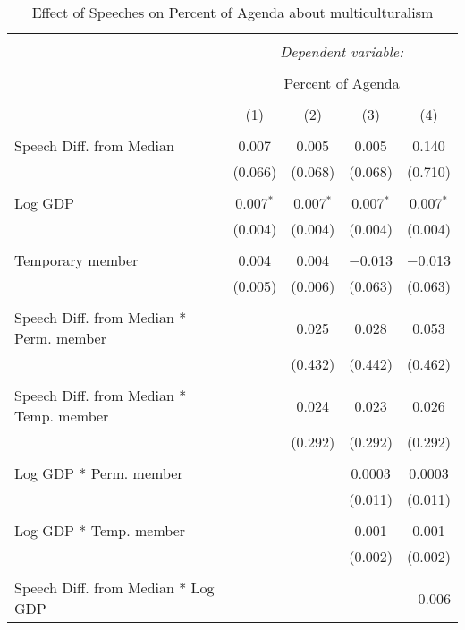 
\begin{table}[!htbp] \centering 
  \caption{Effect of Speeches on Percent of Agenda about multiculturalism} 
  \label{} 
\begin{tabular}{@{\extracolsep{5pt}}lcccc} 
\\[-1.8ex]\hline 
\hline \\[-1.8ex] 
 & \multicolumn{4}{c}{\textit{Dependent variable:}} \\ 
\cline{2-5} 
\\[-1.8ex] & \multicolumn{4}{c}{Percent of Agenda} \\ 
\\[-1.8ex] & (1) & (2) & (3) & (4)\\ 
\hline \\[-1.8ex] 
 Speech Diff. from Median & 0.007 & 0.005 & 0.005 & 0.140 \\ 
  & (0.066) & (0.068) & (0.068) & (0.710) \\ 
  & & & & \\ 
 Log GDP & 0.007$^{*}$ & 0.007$^{*}$ & 0.007$^{*}$ & 0.007$^{*}$ \\ 
  & (0.004) & (0.004) & (0.004) & (0.004) \\ 
  & & & & \\ 
 Temporary member & 0.004 & 0.004 & $-$0.013 & $-$0.013 \\ 
  & (0.005) & (0.006) & (0.063) & (0.063) \\ 
  & & & & \\ 
 Speech Diff. from Median * Perm. member &  & 0.025 & 0.028 & 0.053 \\ 
  &  & (0.432) & (0.442) & (0.462) \\ 
  & & & & \\ 
 Speech Diff. from Median * Temp. member &  & 0.024 & 0.023 & 0.026 \\ 
  &  & (0.292) & (0.292) & (0.292) \\ 
  & & & & \\ 
 Log GDP * Perm. member &  &  & 0.0003 & 0.0003 \\ 
  &  &  & (0.011) & (0.011) \\ 
  & & & & \\ 
 Log GDP * Temp. member &  &  & 0.001 & 0.001 \\ 
  &  &  & (0.002) & (0.002) \\ 
  & & & & \\ 
 Speech Diff. from Median * Log GDP &  &  &  & $-$0.006 \\ 

\end{tabular}
\end{table}
